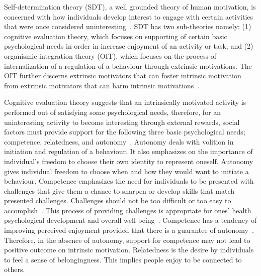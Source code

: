 Self-determination theory (SDT)\citep{deci1985:intrinsic}, a well grounded theory of human motivation, is concerned with how individuals develop interest to engage with certain activities that were once considered uninteresting~\citep{ryan2000intrinsic}. SDT has two sub-theories namely: (1) cognitive evaluation theory, which focuses on supporting of certain basic psychological needs in order in increase enjoyment of an activity or task; and (2) organismic integration theory (OIT), which focuses on the process of internalization of a regulation of a behaviour through extrinsic motivations. The OIT further discerns extrinsic motivators that can foster intrinsic motivation from extrinsic motivators that can harm intrinsic motivations~\citep{ryan2000:self,lee2015:relating}.

Cognitive evaluation theory suggests that an intrinsically motivated activity is performed out of satisfying some psychological needs, therefore, for an uninteresting activity to become interesting through external rewards, social factors must provide support for the following three basic psychological needs; competence, relatedness, and autonomy~\citep{ryan2000intrinsic}. Autonomy deals with volition in initiation and regulation of a behaviour. It also emphasizes on the importance of individual's freedom to choose their own identity to represent oneself.  Autonomy gives individual freedom to choose when and how they would want to initiate a behaviour. Competence emphasizes the need for individuals to be presented with challenges that give them a chance to sharpen or develop skills that match presented challenges. Challenges should not be too difficult or too easy to accomplish~\citep{zhang2008motivational,colineau2011motivating}. This process of providing challenges is appropriate for ones' health psychological development and  overall well-being~\citep{zhang2008motivational}. Competence has a tendency of improving perceived enjoyment provided that there is a guarantee of autonomy~\citep{forde2015informational}. Therefore, in the absence of autonomy, support for competence may not lead to positive outcome on intrinsic motivation. Relatedness is the desire by individuals to feel a sense of belongingness. This implies people enjoy to be connected to others.

